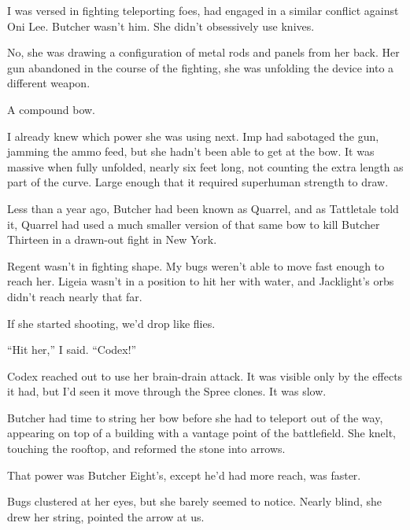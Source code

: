 I was versed in fighting teleporting foes, had engaged in a similar conflict against Oni Lee.  Butcher wasn't him.  She didn't obsessively use knives.



No, she was drawing a configuration of metal rods and panels from her back.  Her gun abandoned in the course of the fighting, she was unfolding the device into a different weapon.



A compound bow.



I already knew which power she was using next.  Imp had sabotaged the gun, jamming the ammo feed, but she hadn't been able to get at the bow.  It was massive when fully unfolded, nearly six feet long, not counting the extra length as part of the curve.  Large enough that it required superhuman strength to draw.



Less than a year ago, Butcher had been known as Quarrel, and as Tattletale told it, Quarrel had used a much smaller version of that same bow to kill Butcher Thirteen in a drawn-out fight in New York.



Regent wasn't in fighting shape.  My bugs weren't able to move fast enough to reach her.  Ligeia wasn't in a position to hit her with water, and Jacklight's orbs didn't reach nearly that far.



If she started shooting, we'd drop like flies.



``Hit her,'' I said.  ``Codex!''



Codex reached out to use her brain-drain attack.  It was visible only by the effects it had, but I'd seen it move through the Spree clones.  It was slow.



Butcher had time to string her bow before she had to teleport out of the way, appearing on top of a building with a vantage point of the battlefield.  She knelt, touching the rooftop, and reformed the stone into arrows.



That power was Butcher Eight's, except he'd had more reach, was faster.



Bugs clustered at her eyes, but she barely seemed to notice.  Nearly blind, she drew her string, pointed the arrow at us.



